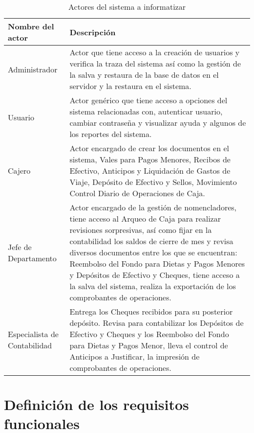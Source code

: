 \begin{table}%
	\begin{supertabular}{|p{5cm}|p{12cm}|}
		\hline
		\textbf{Nombre del actor}
		& \textbf{Descripción} \\ \hline
		
		Administrador
		& Actor que tiene acceso a la creación de usuarios y verifica la traza del sistema así como la gestión de la salva y restaura de la base de datos en el servidor y la restaura en el sistema. \\ \hline
		
		Usuario
		& Actor genérico que tiene acceso a opciones del sistema relacionadas con, autenticar usuario, cambiar contraseña y visualizar ayuda y algunos de los reportes del sistema. \\ \hline
		
		Cajero
		& Actor encargado de crear los documentos en el sistema, Vales para Pagos Menores, Recibos de Efectivo, Anticipos y Liquidación de Gastos de Viaje, Depósito de Efectivo y Sellos, Movimiento Control Diario de Operaciones de Caja. \\ \hline
		
		Jefe de Departamento
		& Actor encargado de la gestión de nomencladores, tiene acceso al Arqueo de Caja para realizar revisiones sorpresivas, así como fijar en la contabilidad los saldos de cierre de mes y revisa diversos documentos entre los que se encuentran: Reembolso del Fondo para Dietas y Pagos Menores y Depósitos de Efectivo y Cheques, tiene acceso a la salva del sistema, realiza la exportación de los comprobantes de operaciones. \\ \hline
		
		Especialista de Contabilidad
		& Entrega los Cheques recibidos para su posterior depósito. Revisa para contabilizar los Depósitos de Efectivo y Cheques y los Reembolso del Fondo para Dietas y Pagos Menor, lleva el control de Anticipos a Justificar, la impresión de comprobantes de operaciones. \\
		
		\hline
	\end{supertabular}
	\caption[Actores del sistema a informatizar]{Actores del sistema a informatizar}
	\label{table:act_sist}
\end{table}

\section{Definición de los requisitos funcionales}
